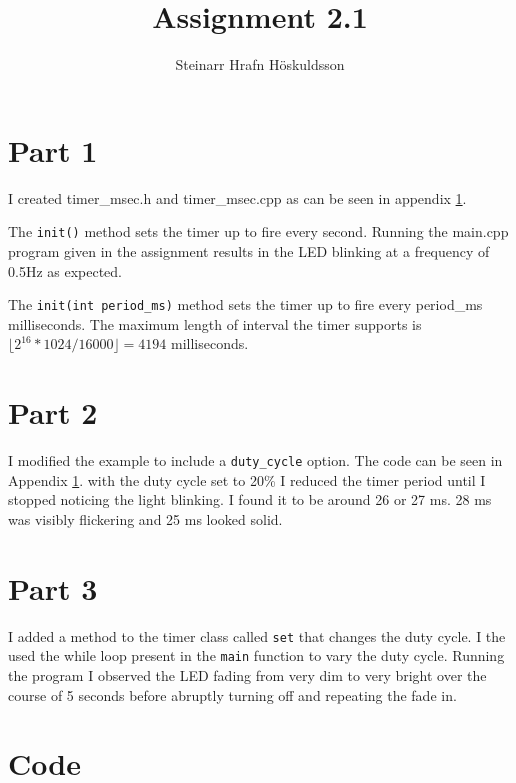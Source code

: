 \documentclass{article}
\title{Assignment 2.1}
\author{Steinarr Hrafn Höskuldsson}
\begin{document}
\pagestyle{firststyle}
{\let\newpage\relax\maketitle}
\section*{Part 1}

I created timer\_msec.h and timer\_msec.cpp as can be seen in appendix \ref{appendix:code}.
\newline

The \texttt{init()} method sets the timer up to fire every second.
Running the main.cpp program given in the assignment results in the LED blinking at a frequency of 0.5Hz as expected. 
\newline

The \texttt{init(int period\_ms)} method sets the timer up to fire every period\_ms milliseconds. 
The maximum length of interval the timer supports is \(\lfloor 2^{16}*1024 / 16000\rfloor = 4194\) milliseconds.

\section*{Part 2}
I modified the example to include a \texttt{duty\_cycle} option. The code can be seen in Appendix \ref{appendix:code}.
\newline
with the duty cycle set to 20\% I reduced  the timer period until I stopped noticing the light blinking. I found it to be around 26 or 27 ms. 28 ms was visibly flickering and 25 ms looked solid.

\section*{Part 3}
I added a method to the timer class called \texttt{set} that changes the duty cycle.
I the used the while loop present in the \texttt{main} function to vary the duty cycle. Running the program I observed the LED fading from very dim to very bright over the course of 5 seconds before abruptly turning off and repeating the fade in. 

\appendix
\section{Code}\label{appendix:code}








\end{document}
